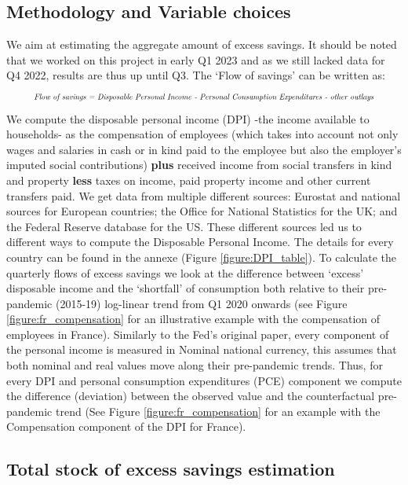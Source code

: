 \subsection{Methodology and Variable choices}
\quad We aim at estimating the aggregate amount of excess savings. 
It should be noted that we worked on this project in early Q1 2023 and as we still lacked data for Q4 2022, results are thus up until Q3.
The ‘Flow of savings’ can be written as: 
\begin{align*}
    \resizebox{.9\hsize}{!}{\textit{\mbox{Flow of savings} = \mbox{Disposable Personal Income} - \mbox{Personal Consumption Expenditures} - \mbox{other outlays}}}
\end{align*}   
\vspace{-0.05cm}
\quad We compute the disposable personal income (DPI) -the income available to households- as the compensation of employees (which takes into account not only wages and salaries in cash or in kind paid to the employee but also the employer’s imputed social contributions) \textbf{plus} received income from social transfers in kind and property \textbf{less} taxes on income, paid property income and other current transfers paid. 
We get data from multiple different sources: Eurostat and national sources for European countries; the Office for National Statistics for the UK; and the Federal Reserve database for the US. 
These different sources led us to different ways to compute the Disposable Personal Income. 
The details for every country can be found in the annexe (Figure \ref{figure:DPI_table}).
To calculate the quarterly flows of excess savings we look at the difference between ‘excess’ disposable income and the ‘shortfall’ of consumption both relative to their pre-pandemic (2015-19) log-linear trend from Q1 2020 onwards (see Figure \ref{figure:fr_compensation} for an illustrative example with the compensation of employees in France). 
Similarly to the Fed's original paper, every component of the personal income is measured in Nominal national currency, this assumes that both nominal and real values move along their pre-pandemic trends. 
Thus, for every DPI and personal consumption expenditures (PCE) component we compute the difference (deviation) between the observed value and the counterfactual pre-pandemic trend (See Figure \ref{figure:fr_compensation} for an example with the Compensation component of the DPI for France). 

\subsection{Total stock of excess savings estimation}

